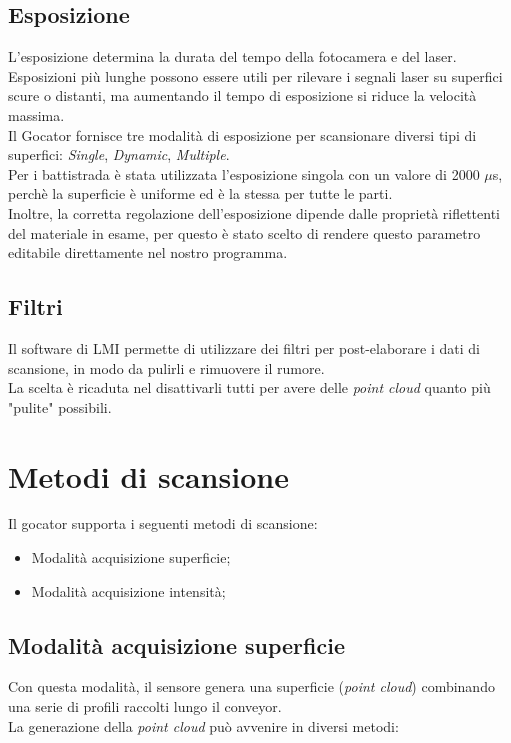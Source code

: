 \subsection{Esposizione}
L'esposizione determina la durata del tempo della fotocamera e del laser. Esposizioni più lunghe possono essere utili per rilevare i segnali laser su superfici scure o distanti, ma aumentando il tempo di esposizione si riduce la velocità massima.\\
\newline
Il Gocator fornisce tre modalità di esposizione per scansionare diversi tipi di superfici: \textit{Single}, \textit{Dynamic}, \textit{Multiple}.\\
Per i battistrada è stata utilizzata l'esposizione singola con un valore di 2000 $\mu$s, perchè la superficie è uniforme ed è la stessa per tutte le parti.\\
\newline
Inoltre, la corretta regolazione dell'esposizione dipende dalle proprietà riflettenti del materiale in esame, per questo è stato scelto di rendere questo parametro editabile direttamente nel nostro programma.

\subsection{Filtri}
Il software di LMI permette di utilizzare dei filtri per post-elaborare i dati di scansione, in modo da pulirli e rimuovere il rumore.\\
La scelta è ricaduta nel disattivarli tutti per avere delle \textit{point cloud} quanto più "pulite" possibili.

\newpage

\section{Metodi di scansione}
Il gocator supporta i seguenti metodi di scansione:

\begin{itemize}
	\item Modalità acquisizione superficie;
	\item Modalità acquisizione intensità;
\end{itemize}

\subsection{Modalità acquisizione superficie}
Con questa modalità, il sensore genera una superficie (\textit{point cloud}) combinando una serie di profili raccolti lungo il conveyor.\\
\newline
La generazione della \textit{point cloud} può avvenire in diversi metodi:

